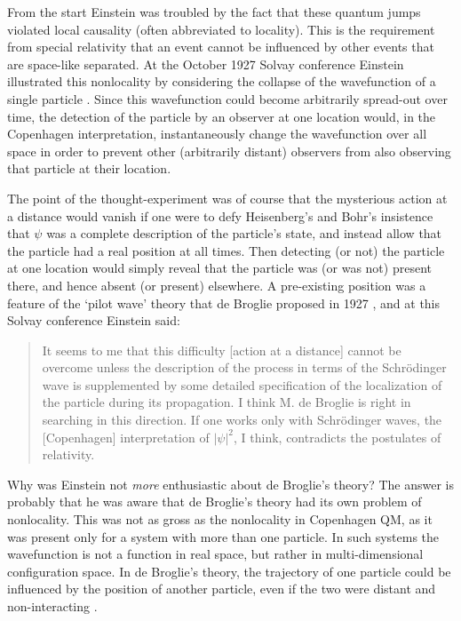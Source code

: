\documentclass[12pt]{iopart}
\begin{document}
From the start Einstein was troubled by the fact that these quantum jumps 
violated local causality (often abbreviated to locality). This is the 
requirement from special relativity that an 
event cannot be influenced by other events that are space-like separated. At the October 1927 Solvay conference Einstein illustrated this nonlocality by considering the collapse of the wavefunction of a single particle \cite{Wic95}. Since this wavefunction 
could become arbitrarily spread-out over time, the detection of the particle by an observer at
one location would, in the Copenhagen interpretation, instantaneously change the wavefunction 
over all space in order to prevent other (arbitrarily distant) observers from also observing that particle at their location. 

The point of the thought-experiment was of course that the mysterious action at a distance would vanish if one were to defy Heisenberg's and Bohr's insistence that $\psi$ was a complete description of the particle's state, and 
instead allow that the particle had a real position at all times. Then detecting (or not) the particle at one location would simply reveal that the particle was (or was not) present  there, and hence absent (or present) elsewhere. A pre-existing  position was a feature of the `pilot wave' theory that de Broglie 
proposed in 1927 \cite{deB56}, and at this Solvay conference Einstein said: \cite{Jam74}
\begin{quote}
It seems to me that this difficulty [action at a distance]
cannot be overcome unless the description of the
process in terms of the Schr\" odinger wave is supplemented
by some detailed specification of the localization of the
particle during its propagation. I think M. de Broglie
 is right in searching in this direction. If one
works only with Schr\"odinger waves, the [Copenhagen] interpretation of $|\psi|^2$, 
I think, contradicts the postulates of relativity.
\end{quote}

Why was Einstein not {\em more} enthusiastic about de Broglie's theory? 
The answer is probably that he was aware that de Broglie's theory had its own problem of nonlocality. 
This was not as gross as the nonlocality in Copenhagen QM, as it was present only for a system with more than one particle. In such systems the wavefunction is not a function in real space, but rather in 
 multi-dimensional configuration space. In de Broglie's theory, the trajectory of one particle 
could be influenced by the position of another particle, even if the two were distant and non-interacting \cite{deB56}. 
\end{document}
